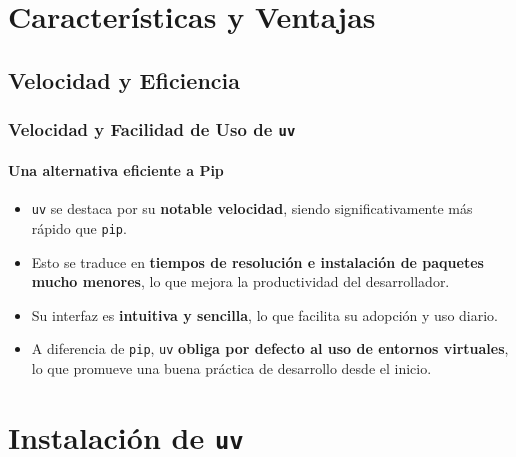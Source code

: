 \documentclass{beamer}
\begin{document}
\section{Características y Ventajas}
\subsection{Velocidad y Eficiencia}
\frame
{
    \frametitle{Velocidad y Facilidad de Uso de \texttt{uv}}
    \framesubtitle{Una alternativa eficiente a Pip}
    \begin{itemize}
        \item \texttt{uv} se destaca por su \textbf{notable velocidad}, siendo significativamente más rápido que \texttt{pip}.
        \item Esto se traduce en \textbf{tiempos de resolución e instalación de paquetes mucho menores}, lo que mejora la productividad del desarrollador.
        \item Su interfaz es \textbf{intuitiva y sencilla}, lo que facilita su adopción y uso diario.
        \item A diferencia de \texttt{pip}, \texttt{uv} \textbf{obliga por defecto al uso de entornos virtuales}, lo que promueve una buena práctica de desarrollo desde el inicio.
    \end{itemize}
}

\section{Instalación de \texttt{uv}}
\end{document}
